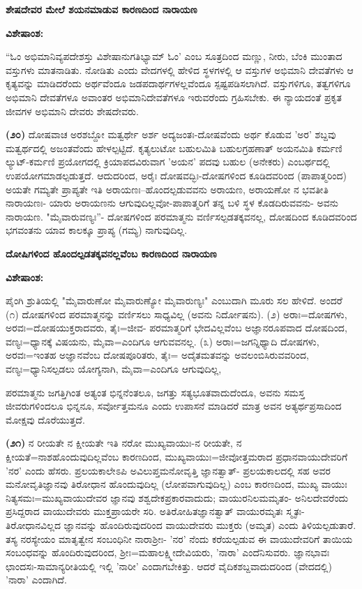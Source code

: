 \begin{center}
\textbf{ಶೇಷದೇವರ ಮೇಲೆ ಶಯನಮಾಡುವ ಕಾರಣದಿಂದ ನಾರಾಯಣ}
\end{center}

\noindent
\textbf{ವಿಶೇಷಾಂಶ:\enginline{-}}

“ಓಂ ಅಭಿಮಾನಿವ್ಯಪದೇಶಸ್ತು ವಿಶೇಷಾನುಗತಿಭ್ಯಾಮ್ ಓಂ' ಎಂಬ ಸೂತ್ರದಿಂದ ಮಣ್ಣು, ನೀರು, ಬೆಂಕಿ ಮುಂತಾದ ವಸ್ತುಗಳು ಮಾತನಾಡಿತು. ನೋಡಿತು ಎಂದು ವೇದಗಳಲ್ಲಿ ಹೇಳಿದ ಸ್ಥಳಗಳಲ್ಲಿ ಆ ವಸ್ತುಗಳ ಅಭಿಮಾನಿ ದೇವತೆಗಳು ಆ ಕೃತ್ಯವನ್ನು ಮಾಡಿದರೆಂದು ಅರ್ಥವೆಂದೂ ಜಡಪದಾರ್ಥಗಳಲ್ಲವೆಂದೂ ಸ್ಪಷ್ಟಪಡಿಸಲಾಗಿದೆ. ವಸ್ತುಗಳಿಗೂ, ತತ್ವಗಳಿಗೂ ಅಭಿಮಾನಿ ದೇವತೆಗಳೂ ಅವಾಂತರ ಅಭಿಮಾನಿದೇವತೆಗಳೂ ಇರುವರೆಂದು ಗ್ರಹಿಸಬೇಕು. ಈ ನ್ಯಾಯದಂತೆ ಪ್ರಕೃತ ಜೀವಗಳ ಅಭಿಮಾನಿ ದೇವರು ಶೇಷದೇವರು.

\textbf{(೨೦)} ದೋಷವಾಚ ಅರಶಬ್ದೋ ಮತ್ವರ್ಥೇ ಅರ್ಶ ಅದ್ಯಜಂತಃ-ದೋಷವೆಂದು ಅರ್ಥ ಕೊಡುವ 'ಅರ' ಶಬ್ದವು ಮತ್ವರ್ಥದಲ್ಲಿ ಅಜಂತವೆಂದು ಹೇಳಲ್ಪಟ್ಟಿದೆ. ಕೃತ್ಯಲುಟೋ ಬಹುಲಮಿತಿ ಬಹುಲಗ್ರಹಣಾತ್ ಅಯನಮಿತಿ ಕರ್ಮಣಿ ಲ್ಯುಟ್-ಕರ್ಮಣಿ ಪ್ರಯೋಗದಲ್ಲಿ ಕ್ರಿಯಾಪದವಿರುವಾಗ 'ಅಯನ' ಪದವು ಬಹುಲ (ಅನೇಕರು) ಎಂಬರ್ಥದಲ್ಲಿ ಉಪಯೋಗಮಾಡಲ್ಪಡುತ್ತದೆ. ಆದುದರಿಂದ, ಅರೈಃ ದೋಷವದ್ಭಿಃ-ದೋಷಗಳಿಂದ ಕೂಡಿ\-ದವರಿಂದ (ಪಾಪಾತ್ಮರಿಂದ) ಅಯತೇ ಗಮ್ಯತೇ ಪ್ರಾಪ್ಯತೇ ಇತಿ ಅರಾಯಣಃ--ಹೊಂದಲ್ಪಡುವವನು ಅರಾಯಣ, ಅರಾಯಣೋ ನ ಭವತೀತಿ ನಾರಾಯಣಃ- ಯಾರು ಅರಾಯಣನು ಆಗುವುದಿಲ್ಲವೋ-ಪಾಪಾತ್ಮರಿಗೆ ತನ್ನ ಬಳಿ ಸ್ಥಳ ಕೊಡದಿರುವವನು- ಅವನು ನಾರಾಯಣ. "ಮೈವಾರುವಣ್ಯಃ''- ದೋಷಗಳಿಂದ ಪರಮಾತ್ಮನು ವರ್ಣಿಸಲ್ಪಡತಕ್ಕವನಲ್ಲ, ದೋಷದಿಂದ ಕೂಡಿದವರಿಂದ ಭಗವಂತನು ಯಾವ ಕಾಲಕ್ಕೂ ಪ್ರಾಪ್ಯ (ಗಮ್ಯ) ನಾಗುವುದಿಲ್ಲ.

\begin{center}
\textbf{ದೋಷಿಗಳಿಂದ ಹೊಂದಲ್ಪಡತಕ್ಕವನಲ್ಲವೆಂಬ ಕಾರಣದಿಂದ ನಾರಾಯಣ}
\end{center}

\noindent
\textbf{ವಿಶೇಷಾಂಶ:\enginline{-}}

ಪೈಂಗಿ ಶ್ರುತಿಯಲ್ಲಿ "ಮೈವಾರುಣೋ ಮೈವಾರುಣ್ಯೋ ಮೈವಾರುಣ್ಯಃ" ಎಂಬುದಾಗಿ ಮೂರು ಸಲ ಹೇಳಿದೆ. ಅಂದರೆ (೧) ದೋಷಗಳಿಂದ ಪರಮಾತ್ಮನನ್ನು ವರ್ಣಿಸಲು ಸಾಧ್ಯವಿಲ್ಲ (ಅವನು ನಿರ್ದೋಷನು). (೨) ಅರಾಃ=ದೋಷಗಳು, ಅರವಃ=ದೋಷಯುಕ್ತರಾದವರು, ತೈಃ=ಜೀವ- ಪರಮಾತ್ಮರಿಗೆ ಭೇದವಿಲ್ಲವೆಂಬ ಅಜ್ಞಾನರೂಪವಾದ ದೋಷದಿಂದ, ವಣ್ಯಃ=\-ಧ್ಯಾನಕ್ಕೆ ವಿಷಯನು, ಮೈವಾ=ಎಂದಿಗೂ ಆಗುವವನಲ್ಲ. (೩) ಅರಾಃ=ಜಗನ್ನಿಥ್ಯಾದಿ ದೋಷಗಳು, ಅರವಃ=ಇಂತಹ ಅಜ್ಞಾನವೆಂಬ ದೋಷಪೂರಿತರು, ತೈಃ= ಅದೈತಮತವನ್ನು ಅವಲಂಬಿಸಿರುವವರಿಂದ, ವಣ್ಯಃ=ಧ್ಯಾನಿಸಲ್ಪಡಲು ಯೋಗ್ಯನಾಗಿ, ಮೈವಾ=ಎಂದಿಗೂ ಆಗುವುದಿಲ್ಲ,

ಪರಮಾತ್ಮನು ಜಗತ್ತಿಗಿಂತ ಅತ್ಯಂತ ಭಿನ್ನನೆಂತಲೂ, ಜಗತ್ತು ಸತ್ಯಭೂತವಾದುದೆಂದೂ, ಅವನು ಸಮಸ್ತ ಜೀವರುಗಳಿಂದಲೂ ಭಿನ್ನನೂ, ಸರ್ವೋತ್ತಮನೂ ಎಂದು ಉಪಾಸನೆ ಮಾಡಿದರೆ ಮಾತ್ರ ಅವನ ಅತ್ಯರ್ಥಪ್ರಸಾದಿಂದ ಮೋಕ್ಷವು ದೊರೆಯುತ್ತದೆ.

\textbf{(೨೧)} ನ ರೀಯತೇ ನ ಕ್ಷೀಯತೇ ಇತಿ ನರೋ ಮುಖ್ಯವಾಯುಃ-ನ ರೀಯತೇ, ನ ಕ್ಷೀಯತೆ=ನಾಶಹೊಂದುವುದಿಲ್ಲವೆಂಬ ಕಾರಣದಿಂದ, ಮುಖ್ಯವಾಯುಃ=ಜೀವೋತ್ತಮರಾದ ಪ್ರಧಾನವಾಯುದೇವರಿಗೆ 'ನರ' ಎಂದು ಹೆಸರು. ಪ್ರಲಯಕಾಲೇಽಪಿ ಅವಿಲುಪ್ತಮನೋವೃತ್ತಿ ಜ್ಞಾನತ್ವಾತ್- ಪ್ರಲಯಕಾಲದಲ್ಲಿ ಸಹ ಅವರ ಮನೋವೃತಿಜ್ಞಾನವು ತಿರೋಧಾನ ಹೊಂದುವುದಿಲ್ಲ (ಲೋಪವಾಗುವುದಿಲ್ಲ) ಎಂಬ ಕಾರಣದಿಂದ, ಮುಖ್ಯ ವಾಯುಃ ನಿತ್ಯಸಮಃ=ಮುಖ್ಯ\-ವಾಯುದೇವರ ಜ್ಞಾನವು ಶಶ್ವದೇಕಪ್ರಕಾರವಾದುದು; ವಾಯುರನಿಲಮಮೃತಂ- ಅನಿಲದೇವರೆಂದು ಪ್ರಸಿದ್ದರಾದ ವಾಯುದೇವರು ಮುಕ್ತಪ್ರಾಯರೇ ಸರಿ. ಅತಿರೋಹಿತಜ್ಞಾನತ್ವಾತ್ ವಾಯುರಮೃತಃ ಸ್ಮೃತಃ- ತಿರೋಧಾನವಿಲ್ಲದ ಜ್ಞಾನವನ್ನು ಹೊಂದಿರುವುದರಿಂದ ವಾಯುದೇವರು ಮುಕ್ತರು (ಅಮೃತ) ಎಂದು ತಿಳಿಯಲ್ಪಡುತಾರೆ. ತಸ್ಯ ನರಸ್ಯೇಯಂ ಮಾತೃತ್ವೇನ ಸಂಬಂಧಿನೀ ನಾರಾಶ‍್ರೀಃ- 'ನರ' ನೆಂದು ಕರೆಯಲ್ಪಡುವ ಈ ವಾಯುದೇವರಿಗೆ ತಾಯಿಯ ಸಂಬಂಧವನ್ನು ಹೊಂದಿರುವುದರಿಂದ, ಶ‍್ರೀಃ=ಮಹಾಲಕ್ಷ್ಮೀದೇವಿಯರು, 'ನಾರಾ' ಎಂದೆನಿಸುವರು. ಜ್ಞಾನಭಾವಃ ಛಾಂದಸಃ-ಸಾಮಾನ್ಯರೀತಿಯಲ್ಲಿ ಇಲ್ಲಿ 'ನಾರೀ' ಎಂದಾಗಬೇಕಿತ್ತು. ಆದರೆ ವೈದಿಕಶಬ್ದವಾದುದರಿಂದ (ವೇದದಲ್ಲಿ) 'ನಾರಾ' ಎಂದಾಗಿದೆ.

